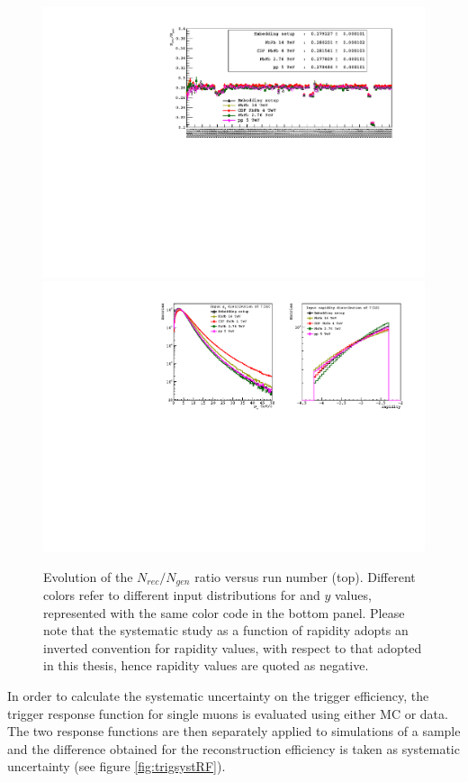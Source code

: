 \begin{figure}[!b]
\begin{center}
\includegraphics[width=\linewidth]{Chapters/Analysis/Figs/Axe/AxE_integrated.pdf}
\includegraphics[width=0.9\linewidth]{Chapters/Analysis/Figs/input_pt_rap_dist.pdf}
\caption{Evolution of the $N_{rec}/N_{gen}$ ratio versus run number (top). Different colors refer to different input distributions for \upsis \pt and $y$ values, represented with the same color code in the bottom panel. Please note that the systematic study as a function of rapidity adopts an inverted convention for rapidity values, with respect to that adopted in this thesis, hence rapidity values are quoted as negative.}
\label{fig:MCsyst}
\end{center}
\end{figure}

In order to calculate the systematic uncertainty on the trigger efficiency, the trigger response function for single muons is evaluated using either MC or data.
The two response functions are then separately applied to simulations of a \upsi sample and the difference obtained for the \upsi reconstruction efficiency is taken as systematic uncertainty (see figure \ref{fig:trigsystRF}).

